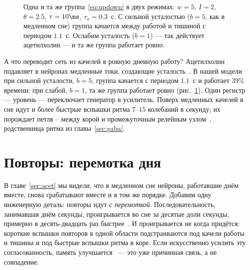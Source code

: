 \begin{figure}[t]
\centering
{}
\caption{Одна и та же группа~\eqref{eq:updown} в двух режимах: $w=5$, $I=2$, $\theta=2.5$, $\tau=10\ms$, $\tau_a=0.3$~с. С сильной усталостью ($b=5$, как в медленном сне) группа качается между работой и тишиной с периодом $1.1$~с. Ослабим усталость ($b=1$) --- так действует ацетилхолин --- и та же группа работает ровно.}
\label{fig:updown}
\end{figure}

А что переводит сеть из качелей в ровную дневную работу? Ацетилхолин подавляет в нейронах медленные токи, создающие усталость~\cite{McCormick1992}. В нашей модели при сильной усталости, $b=5$, группа качается с периодом $1.1$~с и работает $39\%$ времени; при слабой, $b=1$, та же группа работает ровно (рис.~\ref{fig:updown}). Один регистр --- уровень  --- переключает генератор в усилитель. Поверх медленных качелей в сне идут и более быстрые вспышки ритма $7$--$15$ колебаний в секунду; их порождает петля -- между корой и промежуточным релейным узлом~\cite{SteriadeMcCormickSejnowski1993}, родственница ритма из главы~\ref{sec:gaba}.

\section{Повторы: перемотка дня}

В главе~\ref{sec:acet} мы видели, что в медленном сне нейроны, работавшие днём вместе, снова срабатывают вместе и в том же порядке. Добавим одну инженерную деталь: повторы идут \emph{с перемоткой}. Последовательность, занимавшая днём секунды, проигрывается во сне за десятые доли секунды, примерно в десять-двадцать раз быстрее~\cite{Nadasdy1999}. И проигрывается не когда придётся: короткие вспышки повторов в одной области подстраиваются под качели работы и тишины и под быстрые вспышки ритма в коре. Если искусственно усилить эту согласованность, память улучшается~\cite{Maingret2016} --- это уже причинная связь, а не совпадение.

